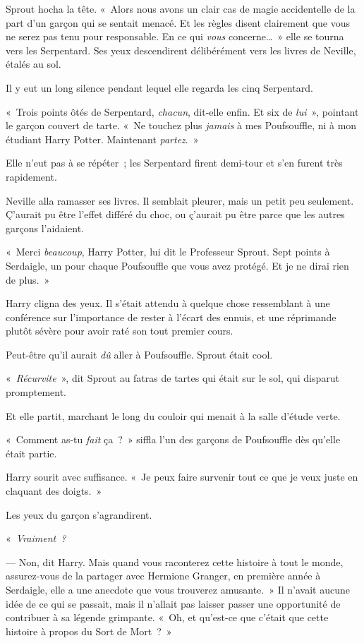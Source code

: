 Sprout hocha la tête. «~Alors nous avons un clair cas de magie accidentelle de la part d'un garçon qui se sentait menacé. Et les règles disent clairement que vous ne serez pas tenu pour responsable. En ce qui \emph{vous} concerne…~» elle se tourna vers les Serpentard. Ses yeux descendirent délibérément vers les livres de Neville, étalés au sol.

Il y eut un long silence pendant lequel elle regarda les cinq Serpentard.

«~Trois points ôtés de Serpentard, \emph{chacun}, dit-elle enfin. Et six de \emph{lui}~», pointant le garçon couvert de tarte. «~Ne touchez plus \emph{jamais} à mes Poufsouffle, ni à mon étudiant Harry Potter. Maintenant \emph{partez}.~»

Elle n'eut pas à se répéter~; les Serpentard firent demi-tour et s'en furent très rapidement.

Neville alla ramasser ses livres. Il semblait pleurer, mais un petit peu seulement. Ç'aurait pu être l'effet différé du choc, ou ç'aurait pu être parce que les autres garçons l'aidaient.

«~Merci \emph{beaucoup}, Harry Potter, lui dit le Professeur Sprout. Sept points à Serdaigle, un pour chaque Poufsouffle que vous avez protégé. Et je ne dirai rien de plus.~»

Harry cligna des yeux. Il s'était attendu à quelque chose ressemblant à une conférence sur l'importance de rester à l'écart des ennuis, et une réprimande plutôt sévère pour avoir raté son tout premier cours.

Peut-être qu'il aurait \emph{dû} aller à Poufsouffle. Sprout était cool.

«~\emph{Récurvite}~», dit Sprout au fatras de tartes qui était sur le sol, qui disparut promptement.

Et elle partit, marchant le long du couloir qui menait à la salle d'étude verte.

«~Comment as-tu \emph{fait} ça~?~» siffla l'un des garçons de Poufsouffle dès qu'elle était partie.

Harry sourit avec suffisance. «~Je peux faire survenir tout ce que je veux juste en claquant des doigts.~»

Les yeux du garçon s'agrandirent.

«~\emph{Vraiment~?}

--- Non, dit Harry. Mais quand vous raconterez cette histoire à tout le monde, assurez-vous de la partager avec Hermione Granger, en première année à Serdaigle, elle a une anecdote que vous trouverez amusante.~» Il n'avait aucune idée de ce qui se passait, mais il n'allait pas laisser passer une opportunité de contribuer à sa légende grimpante. «~Oh, et qu'est-ce que c'était que cette histoire à propos du Sort de Mort~?~»

